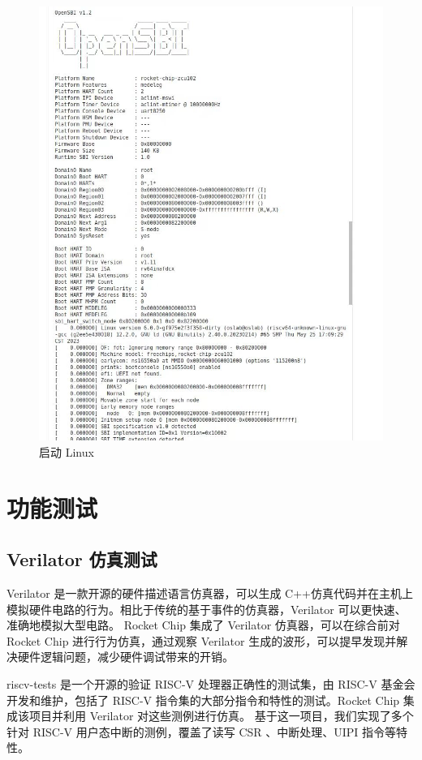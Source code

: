 \begin{figure}
    \centering
    \includegraphics[width=0.9\linewidth]{figures/boot-linux.jpg}
    \caption{启动 Linux}
    \label{fig:boot-linux}
\end{figure}

\section{功能测试}

\subsection{Verilator 仿真测试}

Verilator \cite{verilator} 是一款开源的硬件描述语言仿真器，可以生成 C++仿真代码并在主机上模拟硬件电路的行为。相比于传统的基于事件的仿真器，Verilator 可以更快速、准确地模拟大型电路。
Rocket Chip 集成了 Verilator 仿真器，可以在综合前对 Rocket Chip 进行行为仿真，通过观察 Verilator 生成的波形，可以提早发现并解决硬件逻辑问题，减少硬件调试带来的开销。

riscv-tests \cite{riscvtests} 是一个开源的验证 RISC-V 处理器正确性的测试集，由 RISC-V 基金会开发和维护，包括了 RISC-V 指令集的大部分指令和特性的测试。Rocket Chip 集成该项目并利用 Verilator 对这些测例进行仿真。
基于这一项目，我们实现了多个针对 RISC-V 用户态中断的测例，覆盖了读写 CSR 、中断处理、UIPI 指令等特性。

